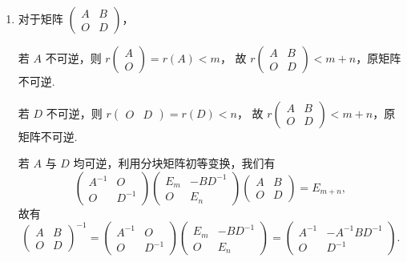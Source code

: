 \documentclass[12pt,fontset=fandol]{ctexart}
\begin{document}
\begin{solve}
\begin{enumerate}
                \item 对于矩阵 $\begin{pmatrix}
                        A & B \\ O & D
                    \end{pmatrix}$，

                    若 $A$ 不可逆，则 $r\begin{pmatrix} A \\ O \end{pmatrix} = r(A) < m$，
                    故 $r\begin{pmatrix} A & B \\ O & D \end{pmatrix} < m+n$，原矩阵不可逆.

                    若 $D$ 不可逆，则 $r\begin{pmatrix} O & D \end{pmatrix} = r(D) < n$，
                    故 $r\begin{pmatrix} A & B \\ O & D \end{pmatrix} < m+n$，原矩阵不可逆.

                    若 $A$ 与 $D$ 均可逆，利用分块矩阵初等变换，我们有
                    \[
                        \begin{pmatrix}
                            A^{-1} & O \\ O & D^{-1}
                        \end{pmatrix} \begin{pmatrix}
                            E_m & -BD^{-1} \\ O & E_n
                        \end{pmatrix} \begin{pmatrix}
                            A & B \\ O & D
                        \end{pmatrix} = E_{m+n},
                    \]
                    故有
                    \[
                        \begin{pmatrix}
                            A & B \\ O & D
                        \end{pmatrix}^{-1} = \begin{pmatrix}
                            A^{-1} & O \\ O & D^{-1}
                        \end{pmatrix} \begin{pmatrix}
                            E_m & -BD^{-1} \\ O & E_n
                        \end{pmatrix} = \begin{pmatrix}
                            A^{-1} & -A^{-1}BD^{-1} \\ O & D^{-1}
                        \end{pmatrix}.
                    \]


\end{enumerate}
\end{solve}
\end{document}
